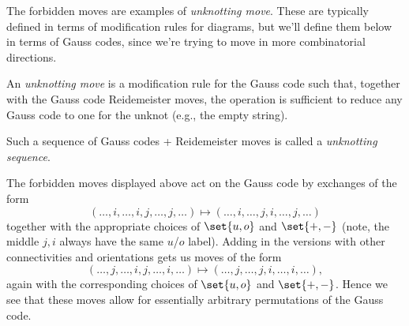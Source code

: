 The forbidden moves are examples of \emph{unknotting move}. These are
typically defined in terms of modification rules for diagrams, but
we'll define them below in terms of Gauss codes, since we're trying to
move in more combinatorial directions.
\begin{definition}
  An \emph{unknotting move} is a modification rule for the Gauss code
  such that, together with the Gauss code Reidemeister moves, the
  operation is sufficient to reduce any Gauss code to one for the
  unknot (e.g., the empty string).

  Such a sequence of Gauss codes + Reidemeister moves is called a
  \emph{unknotting sequence}.
\end{definition}
\begin{example}
  The forbidden moves displayed above act on the Gauss code by
  exchanges of the form
  \[
    (\ldots, i, \ldots, i, j, \ldots, j, \ldots)
    \mapsto
    (\ldots, i, \ldots, j, i, \ldots, j, \ldots)
  \]
  together with the appropriate choices of $\set{u,o}$ and $\set{+,
    -}$ (note, the middle $j,i$ always have the same $u$/$o$ label).
  Adding in the versions with other connectivities and orientations
  gets us moves of the form
  \[
    (\ldots, j, \ldots, i, j, \ldots, i, \ldots) \mapsto (\ldots, j,
    \ldots, j, i, \ldots, i, \ldots),
  \]
  again with the corresponding choices of $\set{u,o}$ and $\set{+,-}$.
  Hence we see that these moves allow for essentially arbitrary
  permutations of the Gauss code.
\end{example}

